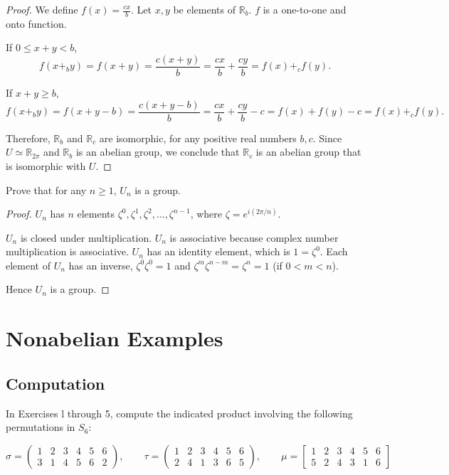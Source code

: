 \begin{proof}
    We define $f(x) = \frac{cx}{b}$. Let $x, y$ be elements of $\mathbb{R}_{b}$. $f$ is a one-to-one and onto function.

    If $0\le x + y < b$,
    \[
        f(x {+}_{b} y) = f(x + y) = \frac{c(x+y)}{b} = \frac{cx}{b} + \frac{cy}{b} = f(x) {+}_{c} f(y).
    \]

    If $x + y \ge b$,
    \[
        f(x {+}_{b} y) = f(x + y - b) = \frac{c(x + y - b)}{b} = \frac{cx}{b} + \frac{cy}{b} - c = f(x) + f(y) - c = f(x) {+}_{c} f(y).
    \]

    Therefore, $\mathbb{R}_{b}$ and $\mathbb{R}_{c}$ are isomorphic, for any positive real numbers $b, c$. Since $U\simeq\mathbb{R}_{2\pi}$ and $\mathbb{R}_{b}$ is an abelian group, we conclude that $\mathbb{R}_{c}$ is an abelian group that is isomorphic with $U$.
\end{proof}

\newpage
\begin{exercise}
    Prove that for any $n\geq 1$, $U_{n}$ is a group.
\end{exercise}

\begin{proof}
    $U_{n}$ has $n$ elements $\zeta^{0}, \zeta^{1}, \zeta^{2}, \ldots, \zeta^{n-1}$, where $\zeta = e^{i(2\pi/n)}$.

    $U_{n}$ is closed under multiplication. $U_{n}$ is associative because complex number multiplication is associative. $U_{n}$ has an identity element, which is $1 = \zeta^{0}$. Each element of $U_{n}$ has an inverse, $\zeta^{0}\zeta^{0} = 1$ and $\zeta^{m}\zeta^{n-m} = \zeta^{n} = 1$ (if $0 < m < n$).

    Hence $U_{n}$ is a group.
\end{proof}

\newpage
\section{Nonabelian Examples}
\setcounter{exercise}{0}

\subsection*{Computation}

In Exercises l through 5, compute the indicated product involving the following permutations in $S_{6}$:

\[
    \sigma = \begin{pmatrix}
        1 & 2 & 3 & 4 & 5 & 6 \\
        3 & 1 & 4 & 5 & 6 & 2
    \end{pmatrix},
    \qquad
    \tau = \begin{pmatrix}
        1 & 2 & 3 & 4 & 5 & 6 \\
        2 & 4 & 1 & 3 & 6 & 5
    \end{pmatrix},
    \qquad
    \mu = \begin{bmatrix}
        1 & 2 & 3 & 4 & 5 & 6 \\
        5 & 2 & 4 & 3 & 1 & 6
    \end{bmatrix}
\]

